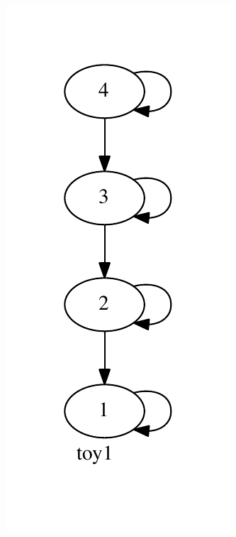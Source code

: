 \documentclass{article}
\begin{document}
\begin{figure}[h]
  \begin{subfigure}{0.25\textwidth}
    \includegraphics[width=\textwidth]{toy1}

\end{subfigure}
\end{figure}
\end{document}
